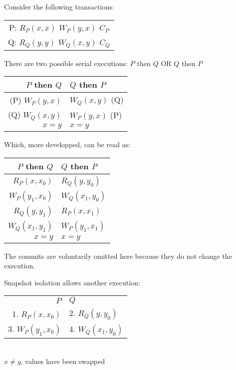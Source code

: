 Consider the following transactions:
\begin{table}[H]
  \centering
  \begin{tabular}{ c }
    P:   $R_P(x, x)$ $W_P(y, x)$ $C_P$ \\
    Q:   $R_Q(y, y)$ $W_Q(x, y)$ $C_Q$ \\
  \end{tabular}
\end{table}


There are two possible serial executions: $P$ then $Q$ OR $Q$ then $P$
\begin{table}[H]
  \centering
  \begin{tabular}{ r | l }
    $P$ then $Q$ & $Q$ then $P$ \\
    \hline
    (P) $W_P(y, x)$ & $W_Q(x, y)$ (Q) \\
    (Q) $W_Q(x, y)$ & $W_P(y, x)$ (P) \\
    $x = y$ & $x = y$ \\
  \end{tabular}
\end{table}
Which, more developped, can be read as:
\begin{table}[H]
  \centering
  \begin{tabular}{ r | l }
    $P$ then $Q$ & $Q$ then $P$ \\
        \hline
    $R_P(x, x_0)$ &  $R_Q(y, y_0)$ \\
    $W_P(y_1, x_0)$ & $W_Q(x_1, y_0)$ \\
    $R_Q(y, y_1)$ &  $R_P(x, x_1)$ \\
    $W_Q(x_1, y_1)$ & $W_P(y_1, x_1)$ \\
    $x = y$ & $x = y$ \\
  \end{tabular}
\end{table}

The commits are voluntarily omitted here because they do not change the execution.

Snapshot isolation allows another execution:

\begin{table}[H]
  \centering
  \begin{tabular}{ r  l }
    $P$ & $Q$ \\
    1. $R_P(x, x_0)$ & 2. $R_Q(y, y_0)$ \\
    3. $W_P(y_1, x_0)$ & 4. $W_Q(x_1, y_0)$ \\
  \end{tabular}
  \\
  $x \neq y$, values have been swapped
\end{table}


